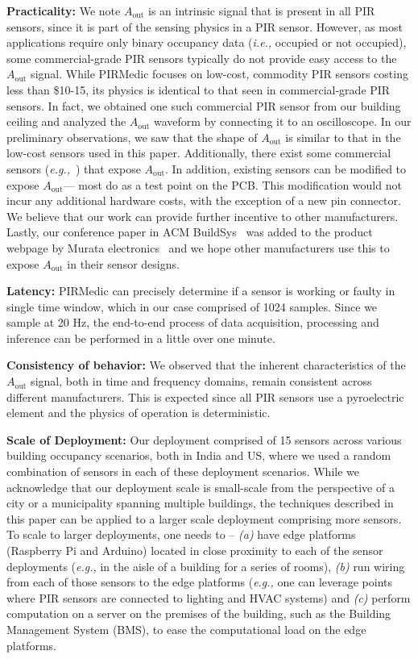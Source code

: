 \documentclass[manuscript]{acmart}
\newcommand{\eg}{{\it e.g.,}\xspace}
\newcommand{\ie}{{\it i.e.,}\xspace}
\newcommand{\ca}{{\it (a) }}
\newcommand{\cb}{{\it (b) }}
\newcommand{\cc}{{\it (c) }}
\newcommand{\aout}{$A_{\text{out}}$\xspace}
\newcommand{\sol}{{PIRMedic}\xspace}
\begin{document}
\noindent\textbf{Practicality:} We note \aout is an intrinsic signal that is present in all PIR sensors, since it is part of the sensing physics in a PIR sensor. 
However, as most applications require only binary occupancy data (\ie occupied or not occupied), some commercial-grade PIR sensors typically do not provide easy access to the \aout signal.
While \sol focuses on low-cost, commodity PIR sensors costing less than \$10-15, its physics is identical to that seen in commercial-grade PIR sensors. In fact, we obtained one such commercial PIR sensor from our building ceiling and analyzed the \aout waveform by connecting it to an oscilloscope. In our preliminary observations, we saw that the shape of \aout is similar to that in the low-cost sensors used in this paper.
Additionally, there exist some commercial sensors (\eg~\cite{panasonic_amn22111,panasonic_amn23111}) that expose \aout.
In addition, existing sensors can be modified to expose \aout --- most do as a test point on the PCB. This modification would not incur any additional hardware costs, with the exception of a new pin connector. We believe that our work can provide further incentive to other manufacturers. Lastly, our conference paper in ACM BuildSys~\cite{10.1145/3486611.3486658} was added to the product webpage by Murata electronics~\cite{murata_imx070_manual} and we hope other manufacturers use this to expose \aout in their sensor designs.

\noindent \textbf{Latency:} \sol can precisely determine if a sensor is working or faulty in single time window, which in our case comprised of 1024 samples. Since we sample at 20 Hz, the end-to-end process of data acquisition, processing and inference can be performed in a little over one minute.

\noindent\textbf{Consistency of behavior:} We observed that the inherent characteristics of the \aout signal, both in time and frequency domains, remain consistent across different manufacturers. This is expected since all PIR sensors use a pyroelectric element and the physics of operation is deterministic.

\noindent \textbf{Scale of Deployment:} Our deployment comprised of 15 sensors across various building occupancy scenarios, both in India and US, where we used a random combination of sensors in each of these deployment scenarios. While we acknowledge that our deployment scale is small-scale from the perspective of a city or a municipality spanning multiple buildings, the techniques described in this paper can be applied to a larger scale deployment comprising more sensors. To scale to larger deployments, one needs to -- \ca have edge platforms (Raspberry Pi and Arduino) located in close proximity to each of the sensor deployments (\eg in the aisle of a building for a series of rooms), \cb run wiring from each of those sensors to the edge platforms (\eg one can leverage points where PIR sensors are connected to lighting and HVAC systems) and \cc perform computation on a server on the premises of the building, such as the Building Management System (BMS), to ease the computational load on the edge platforms.
\end{document}
